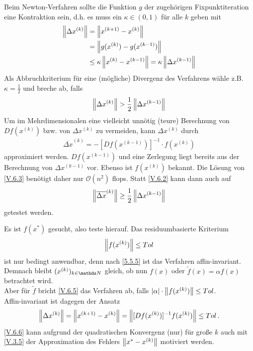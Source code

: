 Beim Newton-Verfahren sollte die Funktion $g$ der zugehörigen
Fixpunktiteration eine Kontraktion sein, d.h. es muss ein 
$\kappa \in (0,1)$ für alle $k$ geben mit
\begin{align}\nonumber
  \left\| \Delta x^{(k)} \right\|&=\left\| x^{(k+1)}-x^{(k)} \right\| \\ \nonumber
                     &= \left\| g(x^{(k)})-g(x^{(k-1)}) \right\|\\
                     &\leq \kappa\left\| x^{(k)}-x^{(k-1)} \right\| = \kappa \left\| \Delta x^{(k-1)} \right\|
                       \label{V.6.1}
\end{align}
Als Abbruchkriterium für eine (mögliche) Divergenz des Verfahrens wähle z.B.
$\kappa=\frac{1}{2}$ und breche ab, falls 
\begin{gather}
  \nn{\Delta x^{(k)}}>\frac{1}{2}\nn{\Delta x^{(k-1)}}
  \label{V.6.2}
\end{gather}
Um im Mehrdimensionalen eine vielleicht unnötig (teure) Berechnung
von $Df(x^{(k)})$ bzw. von $\Delta x^{(k)}$ zu vermeiden, kann 
$\Delta x^{(k)}$ durch 
\begin{gather}
  \overline{\Delta x}^{(k)} = -[Df(x^{(k-1)})]^{-1}\cdot f(x^{(k)})
  \label{V.6.3}
\end{gather}
approximiert werden.
$Df(x^{(k-1)})$ und eine Zerlegung liegt bereits aus der Berechnung von $\Delta x^{(k-1)}$ vor.
Ebenso ist $f(x^{(k)})$ bekannt.
Die Lösung von \eqref{V.6.3} benötigt daher nur $\mathcal{O}(n^2)$ flops.
Statt \eqref{V.6.2} kann dann auch auf 
\begin{gather}
  \left\| \overline{\Delta x}^{(k)} \right\| \geq \frac{1}{2} \left\| \Delta x^{(k-1)} \right\|
  \label{V.6.4}
\end{gather}
getestet werden.


Es ist $f(x^{*})$ gesucht, also teste hierauf. Das residuumbasierte Kriterium
\begin{gather}
  \left\| f(x^{(k)}) \right\|\leq Tol
  \label{V.6.5}
\end{gather}
ist nur bedingt anwendbar, denn nach \ref{5.5.5} ist das Verfahren affin-invariant.
Demnach bleibt $(x^{(k)})_{k\in\N}$ gleich,
ob nun $f(x)$ oder $\widetilde{f}(x) =\alpha f(x) $ betrachtet wird.\\
Aber für $\widetilde{f}$ bricht \eqref{V.6.5} das Verfahren ab, 
falls $|\alpha|\cdot \left\| f(x^{(k)}) \right\| \leq Tol$. \\
Affin-invariant ist dagegen der Ansatz
\begin{gather}
  \left\| \Delta x^{(k)} \right\|= \left\| x^{(k+1)}-x^{(k)} \right\| 
  = \left\| [Df(x^{(k)})]^{-1}f(x^{(k)}) \right\| 
  \leq Tol \, .
  \label{V.6.6}
\end{gather}
\eqref{V.6.6} kann aufgrund der quadratischen Konvergenz (nur) für 
große $k$ auch mit \eqref{V.3.5} der Approximation des Fehlers 
$\left\| x^{*}-x^{(k)} \right\| $ motiviert werden.


